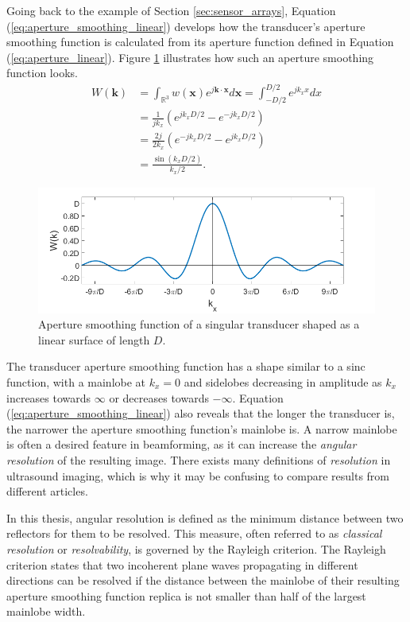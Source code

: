 Going back to the example of Section \ref{sec:sensor_arrays}, Equation (\ref{eq:aperture_smoothing_linear}) develops how the transducer's aperture smoothing function is calculated from its aperture function defined in Equation (\ref{eq:aperture_linear}). Figure \ref{fig:linarray} illustrates how such an aperture smoothing function looks.
\begin{align}
    W(\boldsymbol{k}) &= \int_{\mathbb{R}^3} w(\boldsymbol{x}) e^{j \boldsymbol{k} \cdot \boldsymbol{x}} d\boldsymbol{x} = \int_{-D/2}^{D/2} e^{j k_x x} dx \nonumber \\
    &= \frac{1}{j k_x} (e^{j k_x D/2} - e^{-j k_x D/2}) \nonumber \\
    &= \frac{2j}{2k_x} (e^{-j k_x D/2} - e^{j k_x D/2}) \nonumber \\
    &= \frac{\sin(k_x D/2)}{k_x/2}.
\label{eq:aperture_smoothing_linear}
\end{align}

\begin{figure}[ht]
    \includegraphics[width=\linewidth]{./images/background/aperture_smoothing_function.png}
	\caption{Aperture smoothing function of a singular transducer shaped as a linear surface of length $D$.}
	\label{fig:linarray}
\end{figure}
\noindent
The transducer aperture smoothing function has a shape similar to a sinc function, with a mainlobe at $k_x = 0$ and sidelobes decreasing in amplitude as $k_x$ increases towards $\infty$ or decreases towards $-\infty$. Equation (\ref{eq:aperture_smoothing_linear}) also reveals that the longer the transducer is, the narrower the aperture smoothing function's mainlobe is. A narrow mainlobe is often a desired feature in beamforming, as it can increase the \textit{angular resolution} of the resulting image. There exists many definitions of \textit{resolution} in ultrasound imaging, which is why it may be confusing to compare results from different articles.

In this thesis, angular resolution is defined as the minimum distance between two reflectors for them to be resolved. This measure, often referred to as \textit{classical resolution} or \textit{resolvability}, is governed by the Rayleigh criterion. The Rayleigh criterion states that two incoherent plane waves propagating in different directions can be resolved if the distance between the mainlobe of their resulting aperture smoothing function replica is not smaller than half of the largest mainlobe width.

